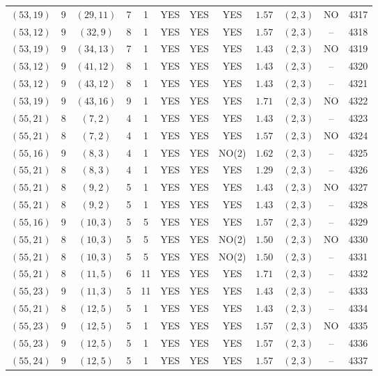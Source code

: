 \begin{longtable}{|c|c|c|c|c|c|c|c|c|c|c|c|}
$(53,19)$ & 9 & $(29,11)$ & 7 & 1 & YES & YES & YES & $1.57$ & $(2,3)$ & NO & 4317\\
$(53,12)$ & 9 & $(32,9)$ & 8 & 1 & YES & YES & YES & $1.57$ & $(2,3)$ & -- & 4318\\
$(53,19)$ & 9 & $(34,13)$ & 7 & 1 & YES & YES & YES & $1.43$ & $(2,3)$ & NO & 4319\\
$(53,12)$ & 9 & $(41,12)$ & 8 & 1 & YES & YES & YES & $1.43$ & $(2,3)$ & -- & 4320\\
$(53,12)$ & 9 & $(43,12)$ & 8 & 1 & YES & YES & YES & $1.43$ & $(2,3)$ & -- & 4321\\
$(53,19)$ & 9 & $(43,16)$ & 9 & 1 & YES & YES & YES & $1.71$ & $(2,3)$ & NO & 4322\\
$(55,21)$ & 8 & $(7,2)$ & 4 & 1 & YES & YES & YES & $1.43$ & $(2,3)$ & -- & 4323\\
$(55,21)$ & 8 & $(7,2)$ & 4 & 1 & YES & YES & YES & $1.57$ & $(2,3)$ & NO & 4324\\
$(55,16)$ & 9 & $(8,3)$ & 4 & 1 & YES & YES & NO(2) & $1.62$ & $(2,3)$ & -- & 4325\\
$(55,21)$ & 8 & $(8,3)$ & 4 & 1 & YES & YES & YES & $1.29$ & $(2,3)$ & -- & 4326\\
$(55,21)$ & 8 & $(9,2)$ & 5 & 1 & YES & YES & YES & $1.43$ & $(2,3)$ & NO & 4327\\
$(55,21)$ & 8 & $(9,2)$ & 5 & 1 & YES & YES & YES & $1.43$ & $(2,3)$ & -- & 4328\\
$(55,16)$ & 9 & $(10,3)$ & 5 & 5 & YES & YES & YES & $1.57$ & $(2,3)$ & -- & 4329\\
$(55,21)$ & 8 & $(10,3)$ & 5 & 5 & YES & YES & NO(2) & $1.50$ & $(2,3)$ & NO & 4330\\
$(55,21)$ & 8 & $(10,3)$ & 5 & 5 & YES & YES & NO(2) & $1.50$ & $(2,3)$ & -- & 4331\\
$(55,21)$ & 8 & $(11,5)$ & 6 & 11 & YES & YES & YES & $1.71$ & $(2,3)$ & -- & 4332\\
$(55,23)$ & 9 & $(11,3)$ & 5 & 11 & YES & YES & YES & $1.43$ & $(2,3)$ & -- & 4333\\
$(55,21)$ & 8 & $(12,5)$ & 5 & 1 & YES & YES & YES & $1.43$ & $(2,3)$ & -- & 4334\\
$(55,23)$ & 9 & $(12,5)$ & 5 & 1 & YES & YES & YES & $1.57$ & $(2,3)$ & NO & 4335\\
$(55,23)$ & 9 & $(12,5)$ & 5 & 1 & YES & YES & YES & $1.57$ & $(2,3)$ & -- & 4336\\
$(55,24)$ & 9 & $(12,5)$ & 5 & 1 & YES & YES & YES & $1.57$ & $(2,3)$ & -- & 4337\\

\end{longtable}
